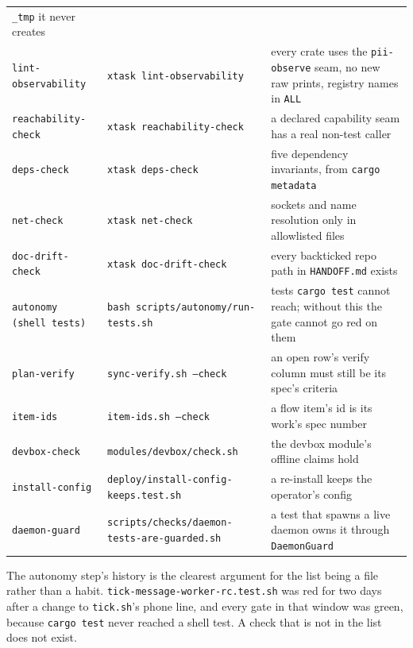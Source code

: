 \begin{longtable}{@{}p{}p{}p{}@{}}
\texttt{\_tmp} it
never creates \\
\texttt{lint-observability} & \texttt{xtask lint-observability} & every crate uses the
\texttt{pii-observe} seam, no new raw prints, registry names in \texttt{ALL} \\
\texttt{reachability-check} & \texttt{xtask reachability-check} & a declared capability seam has
a real
non-test caller \\
\texttt{deps-check} & \texttt{xtask deps-check} & five dependency invariants, from \texttt{cargo
metadata} \\
\texttt{net-check} & \texttt{xtask net-check} & sockets and name resolution only in allowlisted
files \\
\texttt{doc-drift-check} & \texttt{xtask doc-drift-check} & every backticked repo path in
\texttt{HANDOFF.md} exists \\
\texttt{autonomy (shell tests)} & \texttt{bash scripts/autonomy/run-tests.sh} & tests \texttt{cargo
test} cannot reach; without this the gate cannot go red on them \\
\texttt{plan-verify} & \texttt{sync-verify.sh --check} & an open row's verify column must still
be its
spec's criteria \\
\texttt{item-ids} & \texttt{item-ids.sh --check} & a flow item's id is its work's spec number \\
\texttt{devbox-check} & \texttt{modules/devbox/check.sh} & the devbox module's offline claims
hold \\
\texttt{install-config} & \texttt{deploy/install-config-keeps.test.sh} & a re-install keeps the
operator's config \\
\texttt{daemon-guard} & \texttt{scripts/checks/daemon-tests-are-guarded.sh} & a test that spawns a
live daemon owns it through \texttt{DaemonGuard} \\
\bottomrule
\end{longtable}

The autonomy step's history is the clearest argument for the list being a file rather than a
habit. \texttt{tick-message-worker-rc.test.sh} was red for two days after a change to
\texttt{tick.sh}'s phone line, and every gate in that window was green, because \texttt{cargo
test} never reached a shell test. A check that is not in the list does not exist.

